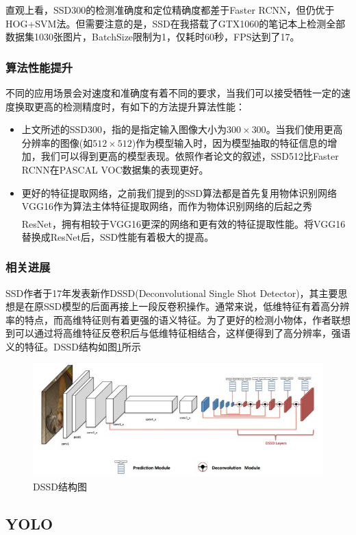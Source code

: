 \documentclass[12pt,a4paper,titlepage]{article}
\newcommand{\upcite}[1]{\textsuperscript{\textsuperscript{\cite{#1}}}}  %
\begin{document}
直观上看，SSD300的检测准确度和定位精确度都差于Faster RCNN，但仍优于HOG+SVM法。但需要注意的是，SSD在我搭载了GTX1060的笔记本上检测全部数据集1030张图片，BatchSize限制为1，仅耗时60秒，FPS达到了17。

\subsubsection{算法性能提升}
不同的应用场景会对速度和准确度有着不同的要求，当我们可以接受牺牲一定的速度换取更高的检测精度时，有如下的方法提升算法性能：
\begin{itemize}
\item 上文所述的SSD300，指的是指定输入图像大小为$300 \times 300$。当我们使用更高分辨率的图像(如$512 \times 512$)作为模型输入时，因为模型抽取的特征信息的增加，我们可以得到更高的模型表现。依照作者论文的叙述，SSD512比Faster RCNN在PASCAL VOC数据集的表现更好。
\item 更好的特征提取网络，之前我们提到的SSD算法都是首先复用物体识别网络VGG16作为算法主体特征提取网络，而作为物体识别网络的后起之秀ResNet\upcite{he2016deep}，拥有相较于VGG16更深的网络和更有效的特征提取性能。将VGG16替换成ResNet后，SSD性能有着极大的提高。
\end{itemize}

\subsubsection{相关进展}
SSD作者于17年发表新作DSSD(Deconvolutional Single Shot Detector)，其主要思想是在原SSD模型的后面再接上一段反卷积操作。通常来说，低维特征有着高分辨率的特点，而高维特征则有着更强的语义特征。为了更好的检测小物体，作者联想到可以通过将高维特征反卷积后与低维特征相结合，这样便得到了高分辨率，强语义的特征。DSSD结构如图\ref{fig:dssd}所示

\begin{figure}[h]
\centering
\includegraphics[width=12cm]{img/dssd.jpg}
\caption{DSSD结构图}
\label{fig:dssd}
\end{figure}


\subsection{YOLO}
\end{document}
